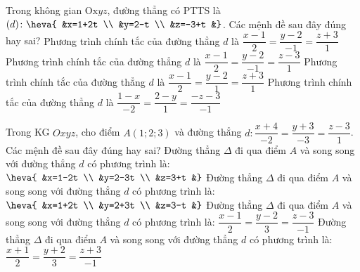 \begin{ex}%
	Trong không gian $\mathrm{Ox} y z$, đường thẳng có PTTS là $(d)\colon \heva{	&x=1+2t \\
		&y=2-t \\
		&z=-3+t
		&}$. Các mệnh đề sau đây đúng hay sai?
	\choiceTF
	{\True Phương trình chính tắc của đường thẳng $d$ là $\dfrac{x-1}{2}=\dfrac{y-2}{-1}=\dfrac{z+3}{1}$}
	{Phương trình chính tắc của đường thẳng $d$ là $\dfrac{x-1}{2}=\dfrac{y-2}{-1}=\dfrac{z-3}{1}$}
	{Phương trình chính tắc của đường thẳng $d$ là $\dfrac{x-1}{2}=\dfrac{y-2}{1}=\dfrac{z+3}{1}$}
	{\True Phương trình chính tắc của đường thẳng $d$ là $\dfrac{1-x}{-2}=\dfrac{2-y}{1}=\dfrac{-z-3}{-1}$}
\end{ex}
\begin{ex}%
	Trong KG $Oxyz$, cho điểm $A(1; 2; 3)$ và đường thẳng $d: \dfrac{x+4}{-2}=\dfrac{y+3}{-3}=\dfrac{z-3}{1}$. Các mệnh đề sau đây đúng hay sai?
	\choiceTF
	{\True Đường thẳng $\Delta$ đi qua điểm $A$ và song song với đường thẳng $d$ có phương trình là: $\heva{	&x=1-2t \\
			&y=2-3t \\
			&z=3+t
			&}$}
	{\True Đường thẳng $\Delta$ đi qua điểm $A$ và song song với đường thẳng $d$ có phương trình là: $\heva{	&x=1+2t \\
			&y=2+3t \\
			&z=3-t
			&}$}
	{\True Đường thẳng $\Delta$ đi qua điểm $A$ và song song với đường thẳng $d$ có phương trình là: $\dfrac{x-1}{2}=\dfrac{y-2}{3}=\dfrac{z-3}{-1}$}
	{Đường thẳng $\Delta$ đi qua điểm $A$ và song song với đường thẳng $d$ có phương trình là: $\dfrac{x+1}{2}=\dfrac{y+2}{3}=\dfrac{z+3}{-1}$}
\end{ex}

